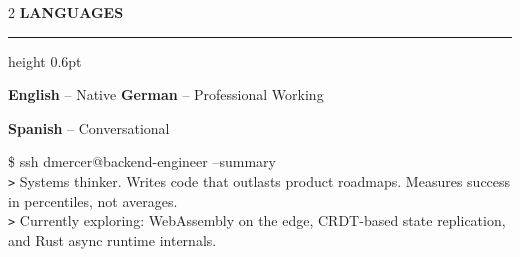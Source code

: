 \documentclass[11pt,a4paper]{article}
\newcommand{\tsection}[1]{%
  \vspace{6pt}
  {\large\bfseries\color{terminalDark}#1}
  \vspace{2pt}
  \hrule height 0.6pt
  \vspace{4pt}
}
\begin{document}
\begin{paracol}{2}
\tsection{LANGUAGES}

\vspace{3pt}
{\color{terminalDark}\textbf{English}} -- Native \hfill {\color{terminalDark}\textbf{German}} -- Professional Working\par
{\color{terminalDark}\textbf{Spanish}} -- Conversational

\end{paracol}

\vspace{6pt}

\begin{terminalbox}
{\color{terminalGreen}\footnotesize\faTerminal\enspace\$ ssh dmercer@backend-engineer --summary}\\[2pt]
{\color{terminalCyan}\footnotesize\texttt{>} Systems thinker. Writes code that outlasts product roadmaps. Measures success in percentiles, not averages.}\\[2pt]
{\color{terminalCyan}\footnotesize\texttt{>} Currently exploring: WebAssembly on the edge, CRDT-based state replication, and Rust async runtime internals.}
\end{terminalbox}
\end{document}
